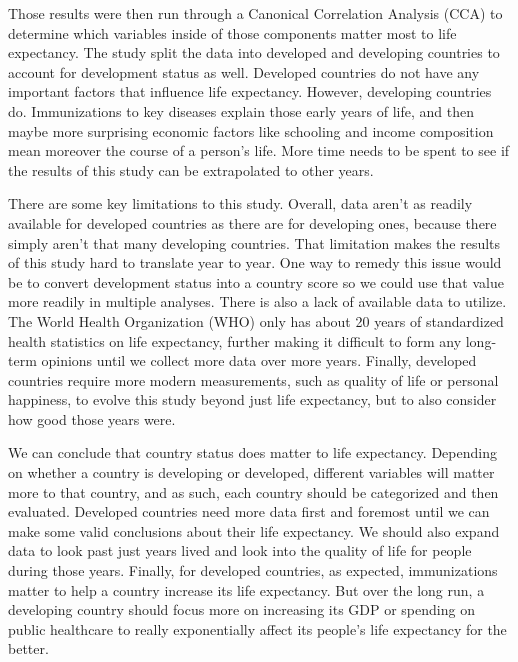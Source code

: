\documentclass[12pt]{article}
\begin{document}
Those results were then run through a Canonical Correlation Analysis (CCA) to determine which variables inside of those components matter most to life expectancy. The study split the data into developed and developing countries to account for development status as well. Developed countries do not have any important factors that influence life expectancy. However, developing countries do. Immunizations to key diseases explain those early years of life, and then maybe more surprising economic factors like schooling and income composition mean moreover the course of a person’s life. More time needs to be spent to see if the results of this study can be extrapolated to other years.

There are some key limitations to this study. Overall, data aren't as readily available for developed countries as there are for developing ones, because there simply aren’t that many developing countries. That limitation makes the results of this study hard to translate year to year. One way to remedy this issue would be to convert development status into a country score so we could use that value more readily in multiple analyses. There is also a lack of available data to utilize. The World Health Organization (WHO) only has about 20 years of standardized health statistics on life expectancy, further making it difficult to form any long-term opinions until we collect more data over more years. Finally, developed countries require more modern measurements, such as quality of life or personal happiness, to evolve this study beyond just life expectancy, but to also consider how good those years were.

We can conclude that country status does matter to life expectancy. Depending on whether a country is developing or developed, different variables will matter more to that country, and as such, each country should be categorized and then evaluated. Developed countries need more data first and foremost until we can make some valid conclusions about their life expectancy. We should also expand data to look past just years lived and look into the quality of life for people during those years. Finally, for developed countries, as expected, immunizations matter to help a country increase its life expectancy. But over the long run, a developing country should focus more on increasing its GDP or spending on public healthcare to really exponentially affect its people’s life expectancy for the better.
\end{document}

